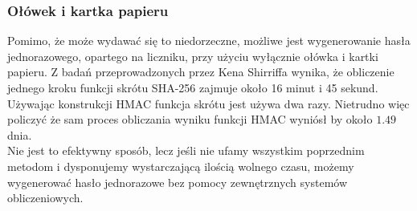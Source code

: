 \subsubsection{Ołówek i kartka papieru}
Pomimo, że może wydawać się to niedorzeczne, możliwe jest wygenerowanie hasła jednorazowego, opartego na liczniku, 
przy użyciu wyłącznie ołówka i kartki papieru. 
Z badań przeprowadzonych przez Kena Shirriffa \cite{pandp} wynika, że obliczenie jednego kroku funkcji skrótu SHA-256
zajmuje około 16 minut i 45 sekund. Używając konstrukcji HMAC funkcja skrótu jest używa dwa razy.
Nietrudno więc policzyć że sam proces obliczania wyniku funkcji HMAC wyniósł by około $1.49$ dnia. \\
Nie jest to efektywny sposób, lecz jeśli nie ufamy wszystkim poprzednim metodom i dysponujemy 
wystarczającą ilością wolnego czasu, możemy wygenerować hasło jednorazowe bez pomocy zewnętrznych 
systemów obliczeniowych.

